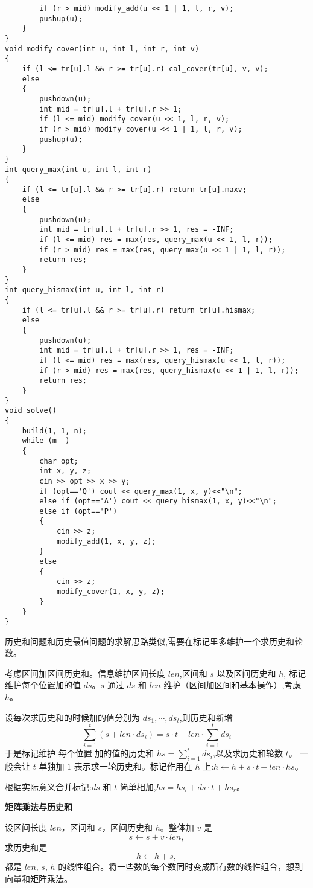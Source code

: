 \documentclass[a4paper,fontset=none]{ctexart}
\begin{document}
\begin{verbatim}
        if (r > mid) modify_add(u << 1 | 1, l, r, v);
        pushup(u);
    }
}
void modify_cover(int u, int l, int r, int v)
{
    if (l <= tr[u].l && r >= tr[u].r) cal_cover(tr[u], v, v);
    else
    {
        pushdown(u);
        int mid = tr[u].l + tr[u].r >> 1;
        if (l <= mid) modify_cover(u << 1, l, r, v);
        if (r > mid) modify_cover(u << 1 | 1, l, r, v);
        pushup(u);
    }
}
int query_max(int u, int l, int r)
{
    if (l <= tr[u].l && r >= tr[u].r) return tr[u].maxv;
    else
    {
        pushdown(u);
        int mid = tr[u].l + tr[u].r >> 1, res = -INF;
        if (l <= mid) res = max(res, query_max(u << 1, l, r));
        if (r > mid) res = max(res, query_max(u << 1 | 1, l, r));
        return res;
    }
}
int query_hismax(int u, int l, int r)
{
    if (l <= tr[u].l && r >= tr[u].r) return tr[u].hismax;
    else
    {
        pushdown(u);
        int mid = tr[u].l + tr[u].r >> 1, res = -INF;
        if (l <= mid) res = max(res, query_hismax(u << 1, l, r));
        if (r > mid) res = max(res, query_hismax(u << 1 | 1, l, r));
        return res;
    }
}
void solve()
{
    build(1, 1, n);
    while (m--)
    {
        char opt;
        int x, y, z;
        cin >> opt >> x >> y;
        if (opt=='Q') cout << query_max(1, x, y)<<"\n";
        else if (opt=='A') cout << query_hismax(1, x, y)<<"\n";
        else if (opt=='P')
        {
            cin >> z;
            modify_add(1, x, y, z);
        }
        else
        {
            cin >> z;
            modify_cover(1, x, y, z);
        }
    }
}
\end{verbatim}

历史和问题和历史最值问题的求解思路类似,需要在标记里多维护一个求历史和轮数。

考虑区间加区间历史和。信息维护区间长度 $len$,区间和 $s$ 以及区间历史和 $h$,
标记维护每个位置加的值 $ds$。$s$ 通过 $ds$ 和 $len$ 维护（区间加区间和基本操作）,考虑 $h$。

设每次求历史和的时候加的值分别为 $ds_1, \cdots, ds_t$,则历史和新增
$$
\sum_{i = 1} ^ t (s + len\cdot ds_i) = s\cdot t + len \cdot \sum_{i = 1} ^ t ds_i
$$
于是标记维护 每个位置 加的值的历史和 $hs = \sum_{i = 1} ^ t ds_i$,以及求历史和轮数 $t$。
一般会让 $t$ 单独加 $1$ 表示求一轮历史和。标记作用在 $h$ 上:$h\gets h + s\cdot t + len \cdot hs$。

根据实际意义合并标记:$ds$ 和 $t$ 简单相加,$hs = hs_l + ds\cdot t + hs_r$。


\textbf{矩阵乘法与历史和}

设区间长度 $len$，区间和 $s$，区间历史和 $h$。整体加 $v$ 是
\[
s \gets s + v \cdot len,
\]
求历史和是
\[
h \gets h + s,
\]
都是 $len,\,s,\,h$ 的线性组合。将一些数的每个数同时变成所有数的线性组合，想到向量和矩阵乘法。
\end{document}
